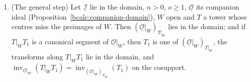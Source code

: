 \begin{lemma}
\begin{enumerate}
\(\operatorname{inv}_{\underline{\mathcal S}_0}(T|_WT_1)=\operatorname{inv}_{\underline{\mathcal S}_1}(T_1)\) on the cosupport.
\item (The general step) Let \(\underline{\mathcal I}\) lie in the domain, \(n>0\), \(o\ge1\), \(\underline{\mathcal O}\) its companion ideal (Proposition~\ref{bcalc:companion-domain}),
\(W\) open and \(T\) a tower whose centres miss the preimages of \(W\). Then \((\underline{\mathcal O}|_W)_{T|_W}\) lies in the domain; and if \(T|_WT_1\) is a canonical
segment of \(\underline{\mathcal O}|_W\), then \(T_1\) is one of \((\underline{\mathcal O}|_W)_{T|_W}\), the transforms along \(T|_WT_1\) lie in the domain, and
\(\operatorname{inv}_{\underline{\mathcal O}|_W}(T|_WT_1)=\operatorname{inv}_{(\underline{\mathcal O}|_W)_{T|_W}}(T_1)\) on the cosupport.
\end{enumerate}
\end{lemma}
